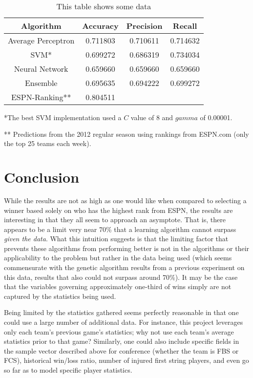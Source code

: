 \documentclass[10pt,letterpaper]{article}
\begin{document}
\begin{table}[hbtp]
\centering
\begin{tabular}{| c | c | c | c |}
\hline
\textbf{Algorithm} & \textbf{Accuracy} & \textbf{Precision} & \textbf{Recall} \\ \hline

Average Perceptron & 0.711803 & 0.710611 & 0.714632 \\ \hline
SVM*  & 0.699272 & 0.686319 & 0.734034 \\ \hline
Neural Network & 0.659660 & 0.659660 & 0.659660  \\ \hline
Ensemble & 0.695635 & 0.694222 & 0.699272\\ \hline
ESPN-Ranking** & 0.804511 &  & \\ \hline

\end{tabular}
\caption{This table shows some data}
\label{table:results}
\end{table}

*The best SVM implementation used a $C$ value of 8 and $gamma$ of 0.00001.

** Predictions from the 2012 regular season using rankings from ESPN.com (only the top 25 teams each week).

\section{Conclusion}

While the results are not as high as one would like when compared to selecting a winner based solely on who has the highest rank from ESPN, the results are interesting in that they all seem to approach an asymptote. 
That is, there appears to be a limit very near 70\% that a learning algorithm cannot surpass \emph{given the data}.
What this intuition suggests is that the limiting factor that prevents these algorithms from performing better is not in the algorithms or their applicability to the problem but rather in the data being used (which seems commensurate with the genetic algorithm results from a previous experiment on this data, results that also could not surpass around 70\%).
It may be the case that the variables governing approximately one-third of wins simply are not captured by the statistics being used.

Being limited by the statistics gathered seems perfectly reasonable in that one could use a large number of additional data.
For instance, this project leverages only each team's previous game's statistics; why not use each team's average statistics prior to that game?
Similarly, one could also include specific fields in the sample vector described above for conference (whether the team is FBS or FCS), historical win/loss ratio, number of injured first string players, and even go so far as to model specific player statistics.
\end{document}
